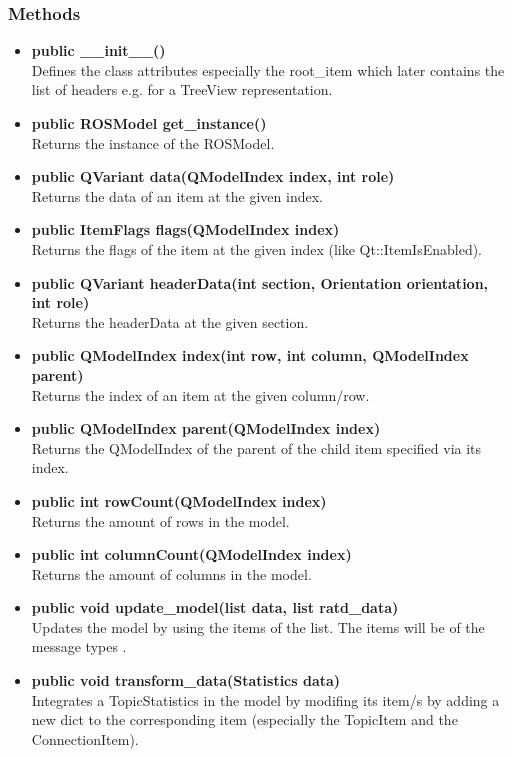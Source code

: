 \subsubsection{Methods}
\begin{itemize}
  \item \textbf{public \_\_init\_\_()}\\ 
  Defines the class attributes especially the root\_item which later contains the list of headers e.g. for a TreeView representation.
  \item \textbf{public ROSModel get\_instance()}\\
  Returns the instance of the ROSModel.
  \item \textbf{public QVariant data(QModelIndex index, int role)}\\
  Returns the data of an item at the given index.
  \item \textbf{public ItemFlags flags(QModelIndex index)}\\
  Returns the flags of the item at the given index (like Qt::ItemIsEnabled).
  \item \textbf{public QVariant headerData(int section, Orientation orientation, int role)}\\ 
  Returns the headerData  at the given section.
  \item \textbf{public QModelIndex index(int row, int column, QModelIndex parent)}\\
  Returns the index of an item at the given column/row.
  \item \textbf{public QModelIndex parent(QModelIndex index)}\\ 
  Returns the QModelIndex of the parent of the child item specified via its index.
  \item \textbf{public int rowCount(QModelIndex index)}\\ 
  Returns the amount of rows in the model.
  \item \textbf{public int columnCount(QModelIndex index)}\\
  Returns the amount of columns in the model.
  \item \textbf{public void update\_model(list data, list ratd\_data)}\\ 
  Updates the model by using the items of the list. The items will be of the message types .
  \item \textbf{public void transform\_data(Statistics data)}\\ 
  Integrates a TopicStatistics in the model by modifing its item/s by adding a new dict to the corresponding item (especially the TopicItem and the ConnectionItem).

\end{itemize}
